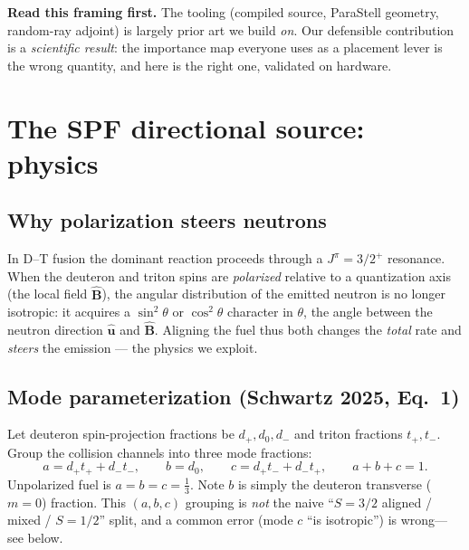 \documentclass[11pt]{article}
\newcommand{\Bhat}{\hat{\mathbf{B}}}
\newcommand{\uu}{\hat{\mathbf{u}}}
\begin{document}
\begin{key}
\textbf{Read this framing first.} The tooling (compiled source, ParaStell geometry, random-ray
adjoint) is largely prior art we build \emph{on}. Our defensible contribution is a
\emph{scientific result}: the importance map everyone uses as a placement lever is the wrong
quantity, and here is the right one, validated on hardware.
\end{key}

\section{The SPF directional source: physics}
\label{sec:physics}

\subsection{Why polarization steers neutrons}
In D--T fusion the dominant reaction proceeds through a $J^\pi=3/2^+$ resonance. When the
deuteron and triton spins are \emph{polarized} relative to a quantization axis (the local field
$\Bhat$), the angular distribution of the emitted neutron is no longer isotropic: it acquires a
$\sin^2\theta$ or $\cos^2\theta$ character in $\theta$, the angle between the neutron direction
$\uu$ and $\Bhat$. Aligning the fuel thus both changes the \emph{total} rate and \emph{steers}
the emission --- the physics we exploit.

\subsection{Mode parameterization (Schwartz 2025, Eq.~1)}
Let deuteron spin-projection fractions be $d_+,d_0,d_-$ and triton fractions $t_+,t_-$. Group the
collision channels into three mode fractions:
\begin{equation}
a = d_+t_+ + d_-t_-,\qquad b = d_0,\qquad c = d_+t_- + d_-t_+,\qquad a+b+c=1 .
\end{equation}
Unpolarized fuel is $a=b=c=\tfrac13$. Note $b$ is simply the deuteron transverse ($m=0$)
fraction. This $(a,b,c)$ grouping is \emph{not} the naive ``$S=3/2$ aligned / mixed / $S=1/2$''
split, and a common error (mode $c$ ``is isotropic'') is wrong---see below.
\end{document}
